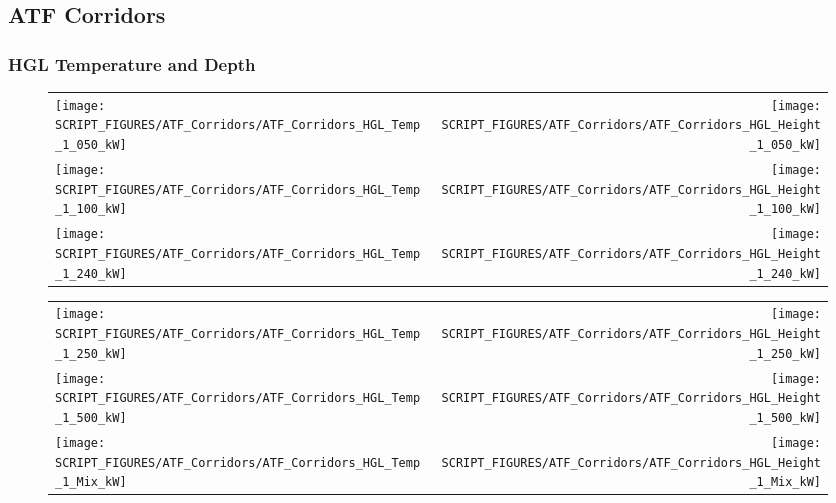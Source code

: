 

\subsection{ATF Corridors}

\subsubsection{HGL Temperature and Depth}

\begin{figure}[!ht]
\begin{tabular*}{\textwidth}{l@{\extracolsep{\fill}}r}
\texttt{[image: SCRIPT\_FIGURES/ATF\_Corridors/ATF\_Corridors\_HGL\_Temp\_1\_050\_kW]} &
\texttt{[image: SCRIPT\_FIGURES/ATF\_Corridors/ATF\_Corridors\_HGL\_Height\_1\_050\_kW]} \\
\texttt{[image: SCRIPT\_FIGURES/ATF\_Corridors/ATF\_Corridors\_HGL\_Temp\_1\_100\_kW]} &
\texttt{[image: SCRIPT\_FIGURES/ATF\_Corridors/ATF\_Corridors\_HGL\_Height\_1\_100\_kW]} \\
\texttt{[image: SCRIPT\_FIGURES/ATF\_Corridors/ATF\_Corridors\_HGL\_Temp\_1\_240\_kW]} &
\texttt{[image: SCRIPT\_FIGURES/ATF\_Corridors/ATF\_Corridors\_HGL\_Height\_1\_240\_kW]}
\end{tabular*}
\end{figure}

\begin{figure}[!ht]
\begin{tabular*}{\textwidth}{l@{\extracolsep{\fill}}r}
\texttt{[image: SCRIPT\_FIGURES/ATF\_Corridors/ATF\_Corridors\_HGL\_Temp\_1\_250\_kW]} &
\texttt{[image: SCRIPT\_FIGURES/ATF\_Corridors/ATF\_Corridors\_HGL\_Height\_1\_250\_kW]} \\
\texttt{[image: SCRIPT\_FIGURES/ATF\_Corridors/ATF\_Corridors\_HGL\_Temp\_1\_500\_kW]} &
\texttt{[image: SCRIPT\_FIGURES/ATF\_Corridors/ATF\_Corridors\_HGL\_Height\_1\_500\_kW]} \\
\texttt{[image: SCRIPT\_FIGURES/ATF\_Corridors/ATF\_Corridors\_HGL\_Temp\_1\_Mix\_kW]} &
\texttt{[image: SCRIPT\_FIGURES/ATF\_Corridors/ATF\_Corridors\_HGL\_Height\_1\_Mix\_kW]}
\end{tabular*}
\end{figure}

